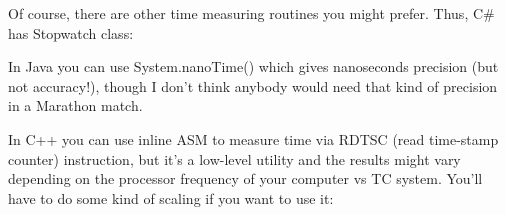 \begin{Shaded}
\begin{Highlighting}[]




 





   \NormalTok{;  }


\NormalTok{\}}
\end{Highlighting}
\end{Shaded}

Of course, there are other time measuring routines you might prefer.
Thus, C\# has Stopwatch class:

\begin{Shaded}
\begin{Highlighting}[]
\NormalTok{;}

 \NormalTok{();}

\NormalTok{();                 }


\NormalTok{;  }
\end{Highlighting}
\end{Shaded}

In Java you can use System.nanoTime() which gives nanoseconds precision
(but not accuracy!), though I don't think anybody would need that kind
of precision in a Marathon match.

In C++ you can use inline ASM to measure time via RDTSC (read time-stamp
counter) instruction, but it's a low-level utility and the results might
vary depending on the processor frequency of your computer vs TC system.
You'll have to do some kind of scaling if you want to use it:

